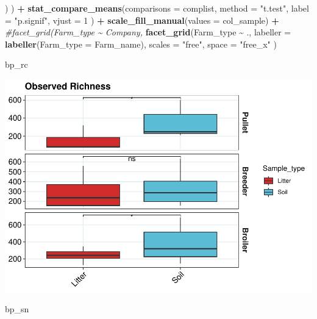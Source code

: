 \documentclass[
]{article}
\newenvironment{Shaded}{\begin{snugshade}}{\end{snugshade}}
\newcommand{\AttributeTok}[1]{\textcolor[rgb]{0.13,0.29,0.53}{#1}}
\newcommand{\CommentTok}[1]{\textcolor[rgb]{0.56,0.35,0.01}{\textit{#1}}}
\newcommand{\DecValTok}[1]{\textcolor[rgb]{0.00,0.00,0.81}{#1}}
\newcommand{\FunctionTok}[1]{\textcolor[rgb]{0.13,0.29,0.53}{\textbf{#1}}}
\newcommand{\NormalTok}[1]{#1}
\newcommand{\SpecialCharTok}[1]{\textcolor[rgb]{0.81,0.36,0.00}{\textbf{#1}}}
\newcommand{\StringTok}[1]{\textcolor[rgb]{0.31,0.60,0.02}{#1}}
\begin{document}
\begin{Shaded}
\begin{Highlighting}[]
\NormalTok{                                  )}
\NormalTok{        ) }\SpecialCharTok{+}
  \FunctionTok{stat\_compare\_means}\NormalTok{(}\AttributeTok{comparisons =}\NormalTok{ complist, }
                     \AttributeTok{method =} \StringTok{"t.test"}\NormalTok{, }
                     \AttributeTok{label =} \StringTok{"p.signif"}\NormalTok{, }
                     \AttributeTok{vjust =} \DecValTok{1}
\NormalTok{                     ) }\SpecialCharTok{+}
  \FunctionTok{scale\_fill\_manual}\NormalTok{(}\AttributeTok{values =}\NormalTok{ col\_sample) }\SpecialCharTok{+}
  \CommentTok{\#facet\_grid(Farm\_type \textasciitilde{} Company,}
  \FunctionTok{facet\_grid}\NormalTok{(Farm\_type }\SpecialCharTok{\textasciitilde{}}\NormalTok{ .,}
             \AttributeTok{labeller =} \FunctionTok{labeller}\NormalTok{(}\AttributeTok{Farm\_type =}\NormalTok{ Farm\_name),}
             \AttributeTok{scales =} \StringTok{"free"}\NormalTok{,}
            \AttributeTok{space =} \StringTok{"free\_x"}
\NormalTok{             )}
\end{Highlighting}
\end{Shaded}

\begin{Shaded}
\begin{Highlighting}[]
\NormalTok{bp\_rc}
\end{Highlighting}
\end{Shaded}

\includegraphics{Final_Project_Pankaj_files/figure-latex/drawing alpha diversity box plots-1.pdf}

\begin{Shaded}
\begin{Highlighting}[]
\NormalTok{bp\_sn}
\end{Highlighting}
\end{Shaded}
\end{document}

